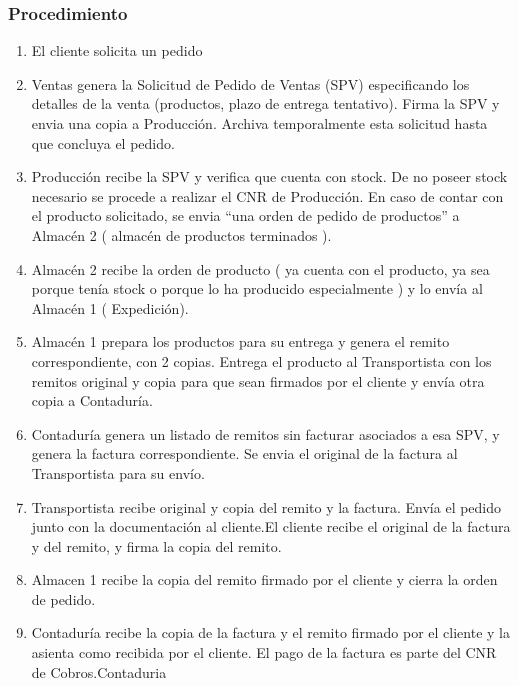 \subsubsection{Procedimiento}
\begin{enumerate}
\item El cliente solicita un pedido
\item Ventas genera la Solicitud de Pedido de Ventas (SPV) especificando los detalles de la venta (productos, plazo de entrega tentativo).
	Firma la SPV y envia una copia a Producci\'on. Archiva temporalmente esta solicitud hasta que concluya el pedido.
\item Producci\'on recibe la SPV y verifica que cuenta con stock. De no poseer stock necesario se procede a realizar el CNR de Producci\'on. 
	En caso de contar con el producto solicitado, se envia ``una orden de pedido de productos'' a Almac\'en 2 ( almacén de productos terminados ).
\item Almac\'en 2 recibe la orden de producto ( ya cuenta con el producto, ya sea porque ten\'ia stock o porque lo ha producido especialmente ) y lo env\'ia al  Almac\'en 1 ( Expedici\'on).
\item Almac\'en 1 prepara los productos para su entrega y genera el remito correspondiente, con 2 copias. Entrega el producto al Transportista con los remitos original y copia para que sean firmados por el cliente y env\'ia otra copia a Contadur\'ia.
\item Contadur\'ia genera un listado de remitos sin facturar asociados a esa SPV, y genera la factura correspondiente. Se envia el original de la factura al Transportista para su env\'io.
\item Transportista recibe original y copia del remito y la factura. Env\'ia el pedido junto con la documentaci\'on al cliente.El cliente recibe el original de la factura y del remito, y firma la copia del remito.
\item Almacen 1 recibe la copia del remito firmado por el cliente y cierra la orden de pedido. 
\item Contadur\'ia recibe la copia de la factura y el remito firmado por el cliente y la asienta como recibida por el cliente. El pago de la factura es parte del CNR de Cobros.Contaduria
\end{enumerate}

